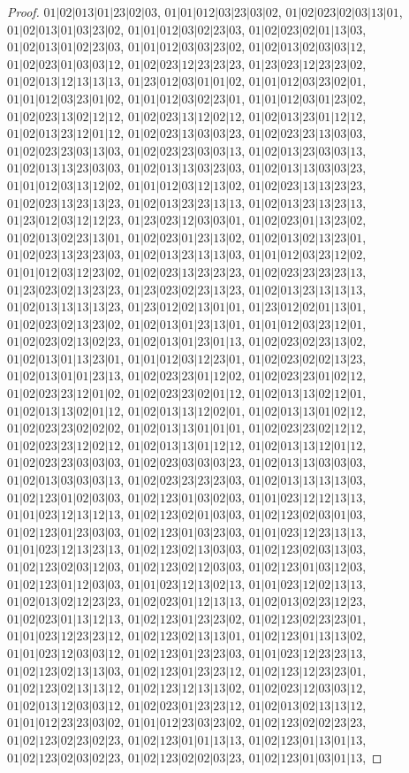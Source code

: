 \documentclass[12pt]{article}
\theoremstyle{plain}
\theoremstyle{definition}
\theoremstyle{remark}
\begin{document}
\begin{proof}
$01|02|013|01|23|02|03$, $01|01|012|03|23|03|02$, $01|02|023|02|03|13|01$, $01|02|013|01|03|23|02$, $01|01|012|03|02|23|03$, $01|02|023|02|01|13|03$, $01|02|013|01|02|23|03$, $01|01|012|03|03|23|02$, $01|02|013|02|03|03|12$, $01|02|023|01|03|03|12$, $01|02|023|12|23|23|23$, $01|23|023|12|23|23|02$, $01|02|013|12|13|13|13$, $01|23|012|03|01|01|02$, $01|01|012|03|23|02|01$, $01|01|012|03|23|01|02$, $01|01|012|03|02|23|01$, $01|01|012|03|01|23|02$, $01|02|023|13|02|12|12$, $01|02|023|13|12|02|12$, $01|02|013|23|01|12|12$, $01|02|013|23|12|01|12$, $01|02|023|13|03|03|23$, $01|02|023|23|13|03|03$, $01|02|023|23|03|13|03$, $01|02|023|23|03|03|13$, $01|02|013|23|03|03|13$, $01|02|013|13|23|03|03$, $01|02|013|13|03|23|03$, $01|02|013|13|03|03|23$, $01|01|012|03|13|12|02$, $01|01|012|03|12|13|02$, $01|02|023|13|13|23|23$, $01|02|023|13|23|13|23$, $01|02|013|23|23|13|13$, $01|02|013|23|13|23|13$, $01|23|012|03|12|12|23$, $01|23|023|12|03|03|01$, $01|02|023|01|13|23|02$, $01|02|013|02|23|13|01$, $01|02|023|01|23|13|02$, $01|02|013|02|13|23|01$, $01|02|023|13|23|23|03$, $01|02|013|23|13|13|03$, $01|01|012|03|23|12|02$, $01|01|012|03|12|23|02$, $01|02|023|13|23|23|23$, $01|02|023|23|23|23|13$, $01|23|023|02|13|23|23$, $01|23|023|02|23|13|23$, $01|02|013|23|13|13|13$, $01|02|013|13|13|13|23$, $01|23|012|02|13|01|01$, $01|23|012|02|01|13|01$, $01|02|023|02|13|23|02$, $01|02|013|01|23|13|01$, $01|01|012|03|23|12|01$, $01|02|023|02|13|02|23$, $01|02|013|01|23|01|13$, $01|02|023|02|23|13|02$, $01|02|013|01|13|23|01$, $01|01|012|03|12|23|01$, $01|02|023|02|02|13|23$, $01|02|013|01|01|23|13$, $01|02|023|23|01|12|02$, $01|02|023|23|01|02|12$, $01|02|023|23|12|01|02$, $01|02|023|23|02|01|12$, $01|02|013|13|02|12|01$, $01|02|013|13|02|01|12$, $01|02|013|13|12|02|01$, $01|02|013|13|01|02|12$, $01|02|023|23|02|02|02$, $01|02|013|13|01|01|01$, $01|02|023|23|02|12|12$, $01|02|023|23|12|02|12$, $01|02|013|13|01|12|12$, $01|02|013|13|12|01|12$, $01|02|023|23|03|03|03$, $01|02|023|03|03|03|23$, $01|02|013|13|03|03|03$, $01|02|013|03|03|03|13$, $01|02|023|23|23|23|03$, $01|02|013|13|13|13|03$, $01|02|123|01|02|03|03$, $01|02|123|01|03|02|03$, $01|01|023|12|12|13|13$, $01|01|023|12|13|12|13$, $01|02|123|02|01|03|03$, $01|02|123|02|03|01|03$, $01|02|123|01|23|03|03$, $01|02|123|01|03|23|03$, $01|01|023|12|23|13|13$, $01|01|023|12|13|23|13$, $01|02|123|02|13|03|03$, $01|02|123|02|03|13|03$, $01|02|123|02|03|12|03$, $01|02|123|02|12|03|03$, $01|02|123|01|03|12|03$, $01|02|123|01|12|03|03$, $01|01|023|12|13|02|13$, $01|01|023|12|02|13|13$, $01|02|013|02|12|23|23$, $01|02|023|01|12|13|13$, $01|02|013|02|23|12|23$, $01|02|023|01|13|12|13$, $01|02|123|01|23|23|02$, $01|02|123|02|23|23|01$, $01|01|023|12|23|23|12$, $01|02|123|02|13|13|01$, $01|02|123|01|13|13|02$, $01|01|023|12|03|03|12$, $01|02|123|01|23|23|03$, $01|01|023|12|23|23|13$, $01|02|123|02|13|13|03$, $01|02|123|01|23|23|12$, $01|02|123|12|23|23|01$, $01|02|123|02|13|13|12$, $01|02|123|12|13|13|02$, $01|02|023|12|03|03|12$, $01|02|013|12|03|03|12$, $01|02|023|01|23|23|12$, $01|02|013|02|13|13|12$, $01|01|012|23|23|03|02$, $01|01|012|23|03|23|02$, $01|02|123|02|02|23|23$, $01|02|123|02|23|02|23$, $01|02|123|01|01|13|13$, $01|02|123|01|13|01|13$, $01|02|123|02|03|02|23$, $01|02|123|02|02|03|23$, $01|02|123|01|03|01|13$, 
\end{proof}
\end{document}
